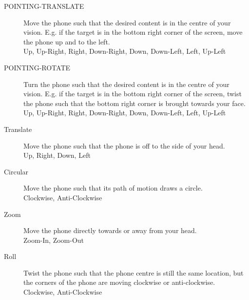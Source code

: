 \begin{description}
    \item[POINTING-TRANSLATE]\nl
    Move the phone such that the desired content is in the centre of your vision. E.g. if the target is in the bottom right corner of the screen, move the phone up and to the left.\\
     Up, Up-Right, Right, Down-Right, Down, Down-Left, Left, Up-Left
    \item[POINTING-ROTATE]\nl
    Turn the phone such that the desired content is in the centre of your vision. E.g. if the target is in the bottom right corner of the screen, twist the phone such that the bottom right corner is brought towards your face.\\
     Up, Up-Right, Right, Down-Right, Down, Down-Left, Left, Up-Left
    \item[Translate]\nl
    Move the phone such that the phone is off to the side of your head.\\
     Up, Right, Down, Left
    \item[Circular]\nl
    Move the phone such that its path of motion draws a circle.\\
     Clockwise, Anti-Clockwise
    \item[Zoom]\nl
    Move the phone directly towards or away from your head.\\
     Zoom-In, Zoom-Out
    \item[Roll]\nl
    Twist the phone such that the phone centre is still the same location, but the corners of the phone are moving clockwise or anti-clockwise.\\
     Clockwise, Anti-Clockwise
\end{description}

